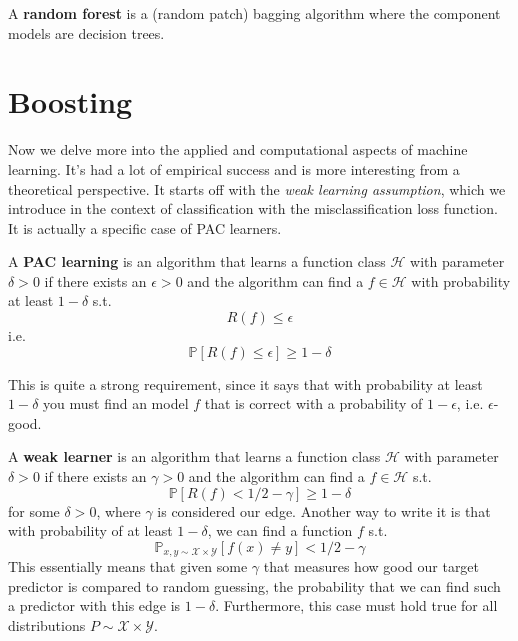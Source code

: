 \documentclass{article}
\begin{document}
    \begin{definition}
      A \textbf{random forest} is a (random patch) bagging algorithm where the component models are decision trees.  
    \end{definition}

\section{Boosting} 

    Now we delve more into the applied and computational aspects of machine learning. It's had a lot of empirical success and is more interesting from a theoretical perspective. It starts off with the \textit{weak learning assumption}, which we introduce in the context of classification with the misclassification loss function. It is actually a specific case of PAC learners. 

    \begin{definition}
      A \textbf{PAC learning} is an algorithm that learns a function class $\mathcal{H}$ with parameter $\delta > 0$ if there exists an $\epsilon > 0$ and the algorithm can find a $f \in \mathcal{H}$ with probability at least $1 - \delta$ s.t.
      \begin{equation}
        R(f) \leq \epsilon 
      \end{equation}
      i.e. 
      \begin{equation}
        \mathbb{P}[ R(f) \leq \epsilon] \geq 1 - \delta
      \end{equation}
    \end{definition}

    This is quite a strong requirement, since it says that with probability at least $1 - \delta$ you must find an model $f$ that is correct with a probability of $1 - \epsilon$, i.e. $\epsilon$-good.

    \begin{definition}
      A \textbf{weak learner} is an algorithm that learns a function class $\mathcal{H}$ with parameter $\delta > 0$ if there exists an $\gamma > 0$ and the algorithm can find a $f \in \mathcal{H}$ s.t. 
      \begin{equation}
        \mathbb{P}[ R(f) < 1/2 - \gamma] \geq 1 - \delta
      \end{equation}
      for some $\delta > 0$, where $\gamma$ is considered our edge. Another way to write it is that with probability of at least $1 - \delta$, we can find a function $f$ s.t. 
      \begin{equation}
        \mathbb{P}_{x, y \sim \mathcal{X} \times \mathcal{Y}} [f(x) \neq y] < 1/2 - \gamma 
      \end{equation}
      This essentially means that given some $\gamma$ that measures how good our target predictor is compared to random guessing, the probability that we can find such a predictor with this edge is $1 - \delta$. Furthermore, this case must hold true for all distributions $P \sim \mathcal{X} \times \mathcal{Y}$. 
    \end{definition}
\end{document}
